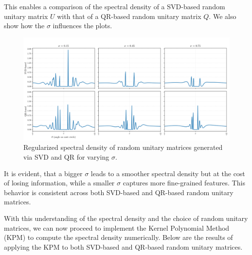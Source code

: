 This enables a comparison of the spectral density of a SVD-based random unitary matrix $U$ with that of a QR-based random unitary matrix $Q$. We also show how the $\sigma$ influences the plots.

\begin{figure}[H]
    \centering
    \includegraphics[width=1\textwidth]{Graphics/compare_svd_qr_spectral_density.png}
    \caption{Regularized spectral density of random unitary matrices generated via SVD and QR for varying $\sigma$.}
    \label{fig:spectral_density_comparison}
\end{figure}

It is evident, that a bigger $\sigma$ leads to a smoother spectral density but at the cost of losing information, while a smaller $\sigma$ captures more fine-grained features. This behavior is consistent across both SVD-based and QR-based random unitary matrices.

With this understanding of the spectral density and the choice of random unitary matrices, we can now proceed to implement the Kernel Polynomial Method (KPM) to compute the spectral density numerically. Below are the results of applying the KPM to both SVD-based and QR-based random unitary matrices.

